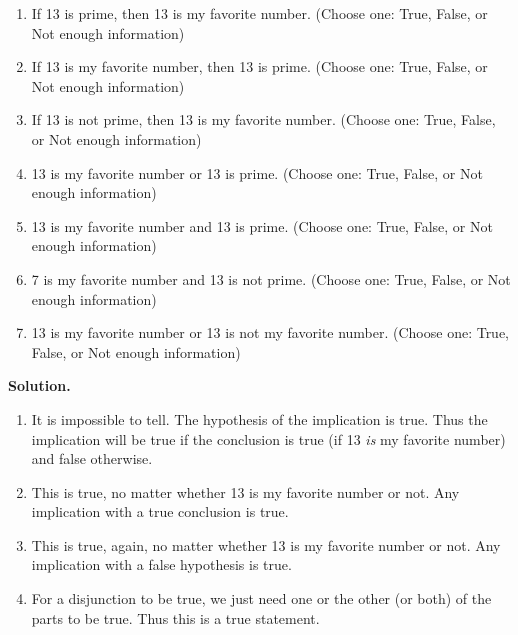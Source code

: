\documentclass[10pt,]{book}
\theoremstyle{plain}
\theoremstyle{definition}
\theoremstyle{definition}
\numberwithin{equation}{chapter}
\begin{document}
\begin{exerciselist}
\par
\hypertarget{p-170}{}%
\leavevmode%
\begin{enumerate}[label=(\alph*)]
\item\hypertarget{li-73}{}\hypertarget{p-171}{}%
If 13 is prime, then 13 is my favorite number. (Choose one: True, False, or Not enough information)%
\item\hypertarget{li-74}{}\hypertarget{p-172}{}%
If 13 is my favorite number, then 13 is prime. (Choose one: True, False, or Not enough information)%
\item\hypertarget{li-75}{}\hypertarget{p-173}{}%
If 13 is not prime, then 13 is my favorite number. (Choose one: True, False, or Not enough information)%
\item\hypertarget{li-76}{}\hypertarget{p-174}{}%
13 is my favorite number or 13 is prime. (Choose one: True, False, or Not enough information)%
\item\hypertarget{li-77}{}\hypertarget{p-175}{}%
13 is my favorite number and 13 is prime. (Choose one: True, False, or Not enough information)%
\item\hypertarget{li-78}{}\hypertarget{p-176}{}%
7 is my favorite number and 13 is not prime. (Choose one: True, False, or Not enough information)%
\item\hypertarget{li-79}{}\hypertarget{p-177}{}%
13 is my favorite number or 13 is not my favorite number. (Choose one: True, False, or Not enough information)%
\end{enumerate}
%
\par
\medskip\noindent%
\textbf{Solution.}\quad \hypertarget{p-178}{}%
\leavevmode%
\begin{enumerate}[label=(\alph*)]
\item\hypertarget{li-80}{}\hypertarget{p-179}{}%
It is impossible to tell.  The hypothesis of the implication is true.  Thus the implication will be true if the conclusion is true (if 13 \emph{is} my favorite number) and false otherwise.%
\item\hypertarget{li-81}{}\hypertarget{p-180}{}%
This is true, no matter whether 13 is my favorite number or not.  Any implication with a true conclusion is true.%
\item\hypertarget{li-82}{}\hypertarget{p-181}{}%
This is true, again, no matter whether 13 is my favorite number or not.  Any implication with a false hypothesis is true.%
\item\hypertarget{li-83}{}\hypertarget{p-182}{}%
For a disjunction to be true, we just need one or the other (or both) of the parts to be true.  Thus this is a true statement.%

\end{enumerate}
\end{exerciselist}
\end{document}
